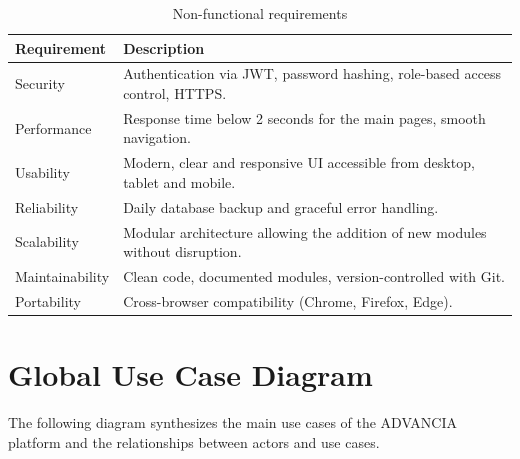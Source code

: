 \begin{table}[H]
\centering
\renewcommand{\arraystretch}{1.35}
\begin{tabularx}{\textwidth}{|>{\columncolor{softblue}}l|X|}
\hline
\rowcolor{primary}
\textbf{\color{white} Requirement} & \textbf{\color{white} Description}\\
\hline
Security & Authentication via JWT, password hashing, role-based access control, HTTPS. \\\hline
Performance & Response time below 2 seconds for the main pages, smooth navigation. \\\hline
Usability & Modern, clear and responsive UI accessible from desktop, tablet and mobile. \\\hline
Reliability & Daily database backup and graceful error handling. \\\hline
Scalability & Modular architecture allowing the addition of new modules without disruption. \\\hline
Maintainability & Clean code, documented modules, version-controlled with Git. \\\hline
Portability & Cross-browser compatibility (Chrome, Firefox, Edge). \\\hline
\end{tabularx}
\caption{Non-functional requirements}
\label{tab:nonfunctional}
\end{table}

\section{Global Use Case Diagram}

The following diagram synthesizes the main use cases of the ADVANCIA platform and the relationships between actors and use cases.


